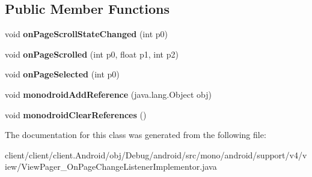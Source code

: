 \subsection*{Public Member Functions}
\begin{DoxyCompactItemize}
\item 
\hypertarget{classmono_1_1android_1_1support_1_1v4_1_1view_1_1ViewPager__OnPageChangeListenerImplementor_a02e554ea766868bfd76878d838994d5f}{}void {\bfseries on\+Page\+Scroll\+State\+Changed} (int p0)\label{classmono_1_1android_1_1support_1_1v4_1_1view_1_1ViewPager__OnPageChangeListenerImplementor_a02e554ea766868bfd76878d838994d5f}

\item 
\hypertarget{classmono_1_1android_1_1support_1_1v4_1_1view_1_1ViewPager__OnPageChangeListenerImplementor_a0c677384a013e2df856b45b6d83e0db6}{}void {\bfseries on\+Page\+Scrolled} (int p0, float p1, int p2)\label{classmono_1_1android_1_1support_1_1v4_1_1view_1_1ViewPager__OnPageChangeListenerImplementor_a0c677384a013e2df856b45b6d83e0db6}

\item 
\hypertarget{classmono_1_1android_1_1support_1_1v4_1_1view_1_1ViewPager__OnPageChangeListenerImplementor_acaacca2c239f05cf90bf740e2a6707ec}{}void {\bfseries on\+Page\+Selected} (int p0)\label{classmono_1_1android_1_1support_1_1v4_1_1view_1_1ViewPager__OnPageChangeListenerImplementor_acaacca2c239f05cf90bf740e2a6707ec}

\item 
\hypertarget{classmono_1_1android_1_1support_1_1v4_1_1view_1_1ViewPager__OnPageChangeListenerImplementor_a1764e9eb5a260e6463f4257d572f0dbf}{}void {\bfseries monodroid\+Add\+Reference} (java.\+lang.\+Object obj)\label{classmono_1_1android_1_1support_1_1v4_1_1view_1_1ViewPager__OnPageChangeListenerImplementor_a1764e9eb5a260e6463f4257d572f0dbf}

\item 
\hypertarget{classmono_1_1android_1_1support_1_1v4_1_1view_1_1ViewPager__OnPageChangeListenerImplementor_ad6e42f49a1f05cca8f7bdd484b17a552}{}void {\bfseries monodroid\+Clear\+References} ()\label{classmono_1_1android_1_1support_1_1v4_1_1view_1_1ViewPager__OnPageChangeListenerImplementor_ad6e42f49a1f05cca8f7bdd484b17a552}

\end{DoxyCompactItemize}


The documentation for this class was generated from the following file\+:\begin{DoxyCompactItemize}
\item 
client/client/client.\+Android/obj/\+Debug/android/src/mono/android/support/v4/view/View\+Pager\+\_\+\+On\+Page\+Change\+Listener\+Implementor.\+java\end{DoxyCompactItemize}
